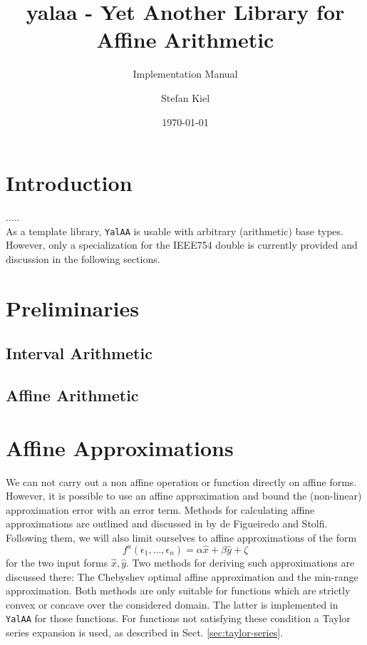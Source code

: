 \documentclass[a4]{scrartcl}
\author{Stefan Kiel}
\title{yalaa - Yet Another Library for Affine Arithmetic}
\subtitle{Implementation Manual}
\date{\today}
\newcommand{\aff}[1]{\ensuremath{\hat{#1}}\xspace}
\newcommand{\yalaa}{\texttt{YalAA}\xspace}
\begin{document}
\maketitle

\section{Introduction}
\label{sec:overview}
.....\\
As a template library, \yalaa is usable with arbitrary (arithmetic) base
types. However, only a specialization for the IEEE754 double is currently
provided and discussion in the following sections.

\section{Preliminaries}
\label{sec:preliminaries}

\subsection{Interval Arithmetic}
\label{sec:interval-arithmetic}

\subsection{Affine Arithmetic}
\label{sec:affine-arithmetic}

\section{Affine Approximations}
\label{sec:affine-appr}
We can not carry out a non affine operation or function directly on affine
forms. However, it is possible to use an affine approximation and bound the
(non-linear) approximation error with an error term. Methods for calculating
affine approximations are outlined and discussed in \cite{stolfi1997} by de
Figueiredo and Stolfi. Following them, we will also limit ourselves to affine
approximations of the form
\[
f^a(\epsilon_1,...,\epsilon_n) = \alpha \aff x + \beta \aff y + \zeta
\]
for the two input forms $\aff x, \aff y$. Two methods for deriving such
approximations are discussed there: The Chebyshev optimal affine approximation
and the min-range approximation. Both methods are only suitable for functions
which are strictly convex or concave over the considered domain. The latter is
implemented in \yalaa for those functions. For functions not satisfying these
condition a Taylor series expansion is used, as described in
Sect. \ref{sec:taylor-series}.
\end{document}
